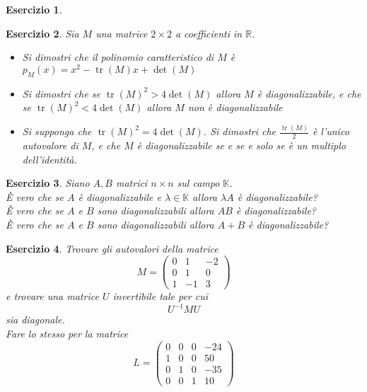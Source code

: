\documentclass{article}
\newtheorem{es}{Esercizio}
\begin{document}
{\begin{es}
\begin{itemize}
        \end{itemize}
\end{es}



\begin{es}
    Sia $M$ una matrice $2\times 2$ a coefficienti in $\mathbb{R}$.\\
    \begin{itemize}
        \item Si dimostri che il polinomio caratteristico di $M$ è $p_M(x)=x^2-\operatorname{tr}(M)x+\det(M)$
        \item Si dimostri che se $\operatorname{tr}(M)^2>4\det(M)$ allora $M$ è diagonalizzabile, e che se $\operatorname{tr}(M)^2<4\det(M)$ allora $M$ non è diagonalizzabile
        \item Si supponga che $\operatorname{tr}(M)^2=4\det(M)$. Si dimostri che $\frac{\operatorname{tr}(M)}{2}$ è l'unico autovalore di $M$, e che $M$ è diagonalizzabile se e  se e solo se è un multiplo dell'identità.
    \end{itemize}
\end{es}




\begin{es}
    Siano $A,B$ matrici $n\times n$ sul campo $\mathbb{K}$.\\
    È vero che se $A$ è diagonalizzabile e $\lambda\in\mathbb{K}$ allora $\lambda A$ è diagonalizzabile?\\
    È vero che se $A$ e $B$ sono diagonalizzabili allora $AB$ è diagonalizzabile?\\
    È vero che se $A$ e $B$ sono diagonalizzabili allora $A+B$ è diagonalizzabile?
\end{es}







\begin{es}
    Trovare gli autovalori della matrice 
    $$M=\begin{pmatrix}
        0 & 1 & -2\\
        0 & 1 & 0\\
        1 & -1 & 3
    \end{pmatrix}$$
    e trovare una matrice $U$ invertibile tale per cui $$U^{-1}MU$$ sia diagonale.\\
    Fare lo stesso per la matrice 
    $$L=\begin{pmatrix}
        0 & 0 & 0 & -24\\
        1 & 0 & 0 & 50\\
        0 & 1 & 0 & -35\\
        0 & 0 & 1 & 10
    \end{pmatrix}$$
\end{es}







}
\end{document}
